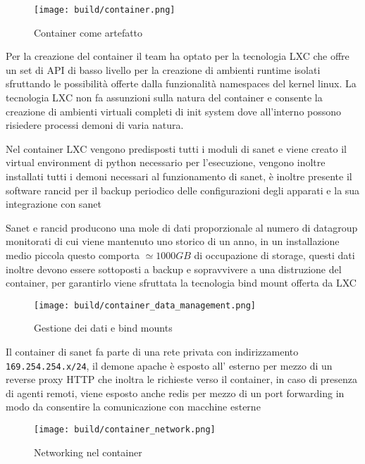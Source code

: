 \begin{figure}[H]
    \centering
    \texttt{[image: build/container.png]}
    \caption{Container come artefatto}
    \label{fig:container}
\end{figure}

Per la creazione del container il team ha optato per la tecnologia LXC\cite{lxc} che offre un set di API di basso livello per la creazione di ambienti runtime isolati sfruttando le possibilità offerte dalla funzionalità namespaces del kernel linux. La tecnologia LXC non fa assunzioni sulla natura del container e consente la creazione di ambienti virtuali completi di init system dove all'interno possono risiedere processi demoni di varia natura.

Nel container LXC vengono predisposti tutti i moduli di sanet e viene creato il virtual environment di python necessario per l'esecuzione, vengono inoltre installati tutti i demoni necessari al funzionamento di sanet, è inoltre presente il software rancid per il backup periodico delle configurazioni degli apparati e la sua integrazione con sanet

Sanet e rancid producono una mole di dati proporzionale al numero di datagroup monitorati di cui viene mantenuto uno storico di un anno, in un installazione medio piccola questo comporta \(\simeq 1000 GB\) di occupazione di storage, questi dati inoltre devono essere sottoposti a backup e sopravvivere a una distruzione del container, per garantirlo viene sfruttata la tecnologia bind mount offerta da LXC\cite{lxc}

\begin{figure}[H]
    \centering
    \texttt{[image: build/container\_data\_management.png]}
    \caption{Gestione dei dati e bind mounts}
    \label{fig:container_data_management}
\end{figure}

Il container di sanet fa parte di una rete privata con indirizzamento \verb|169.254.254.x/24|, il demone apache è esposto all' esterno per mezzo di un reverse proxy HTTP che inoltra le richieste verso il container, in caso di presenza di agenti remoti, viene esposto anche redis per mezzo di un port forwarding in modo da consentire la comunicazione con macchine esterne

\begin{figure}[H]
    \centering
    \texttt{[image: build/container\_network.png]}
    \caption{Networking nel container}
    \label{fig:container_network}
\end{figure}

